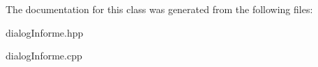 The documentation for this class was generated from the following files\+:\begin{DoxyCompactItemize}
\item 
dialog\+Informe.\+hpp\item 
dialog\+Informe.\+cpp\end{DoxyCompactItemize}
